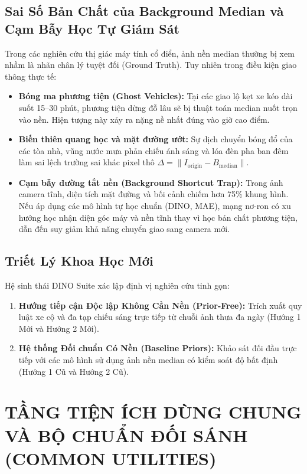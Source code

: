 \documentclass[11pt,a4paper]{article}
\begin{document}
\subsection{Sai Số Bản Chất của Background Median và Cạm Bẫy Học Tự Giám Sát}
Trong các nghiên cứu thị giác máy tính cổ điển, ảnh nền median thường bị xem nhầm là nhãn chân lý tuyệt đối (Ground Truth). Tuy nhiên trong điều kiện giao thông thực tế:
\begin{itemize}
    \item \textbf{Bóng ma phương tiện (Ghost Vehicles):} Tại các giao lộ kẹt xe kéo dài suốt 15--30 phút, phương tiện dừng đỗ lâu sẽ bị thuật toán median nuốt trọn vào nền. Hiện tượng này xảy ra nặng nề nhất đúng vào giờ cao điểm.
    \item \textbf{Biến thiên quang học và mặt đường ướt:} Sự dịch chuyển bóng đổ của các tòa nhà, vũng nước mưa phản chiếu ánh sáng và lóa đèn pha ban đêm làm sai lệch trường sai khác pixel thô $\Delta = \|I_{\text{origin}} - B_{\text{median}}\|$.
    \item \textbf{Cạm bẫy đường tắt nền (Background Shortcut Trap):} Trong ảnh camera tĩnh, diện tích mặt đường và bối cảnh chiếm hơn 75\% khung hình. Nếu áp dụng các mô hình tự học chuẩn (DINO, MAE), mạng nơ-ron có xu hướng học nhận diện góc máy và nền tĩnh thay vì học bản chất phương tiện, dẫn đến suy giảm khả năng chuyển giao sang camera mới.
\end{itemize}

\subsection{Triết Lý Khoa Học Mới}
Hệ sinh thái DINO Suite xác lập định vị nghiên cứu tinh gọn:
\begin{enumerate}
    \item \textbf{Hướng tiếp cận Độc lập Không Cần Nền (Prior-Free):} Trích xuất quy luật xe cộ và đa tạp chiếu sáng trực tiếp từ chuỗi ảnh thưa đa ngày (Hướng 1 Mới và Hướng 2 Mới).
    \item \textbf{Hệ thống Đối chuẩn Có Nền (Baseline Priors):} Khảo sát đối đầu trực tiếp với các mô hình sử dụng ảnh nền median có kiểm soát độ bất định (Hướng 1 Cũ và Hướng 2 Cũ).
\end{enumerate}

\section{TẦNG TIỆN ÍCH DÙNG CHUNG VÀ BỘ CHUẨN ĐỐI SÁNH (COMMON UTILITIES)}
\end{document}
